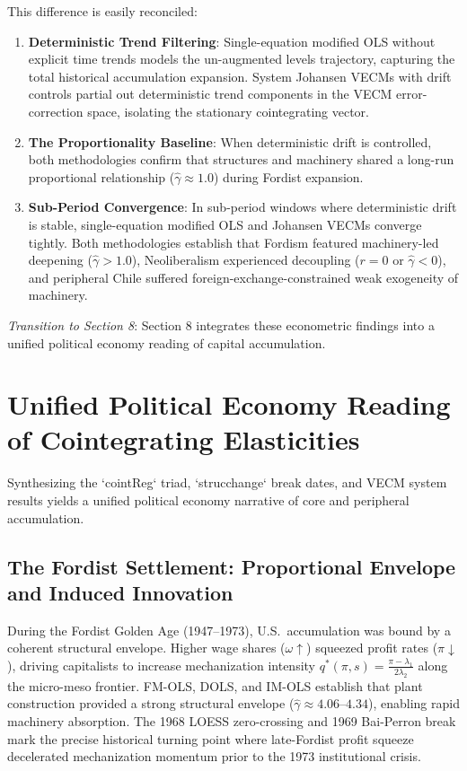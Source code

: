 \documentclass[11pt,a4paper]{article}
\begin{document}
This difference is easily reconciled:
\begin{enumerate}
    \item \textbf{Deterministic Trend Filtering}: Single-equation modified OLS without explicit time trends models the un-augmented levels trajectory, capturing the total historical accumulation expansion. System Johansen VECMs with drift controls partial out deterministic trend components in the VECM error-correction space, isolating the stationary cointegrating vector.
    \item \textbf{The Proportionality Baseline}: When deterministic drift is controlled, both methodologies confirm that structures and machinery shared a long-run proportional relationship ($\hat{\gamma} \approx 1.0$) during Fordist expansion.
    \item \textbf{Sub-Period Convergence}: In sub-period windows where deterministic drift is stable, single-equation modified OLS and Johansen VECMs converge tightly. Both methodologies establish that Fordism featured machinery-led deepening ($\hat{\gamma} > 1.0$), Neoliberalism experienced decoupling ($r=0$ or $\hat{\gamma} < 0$), and peripheral Chile suffered foreign-exchange-constrained weak exogeneity of machinery.
\end{enumerate}

\textit{Transition to Section 8}: Section 8 integrates these econometric findings into a unified political economy reading of capital accumulation.

\FloatBarrier
\section{Unified Political Economy Reading of Cointegrating Elasticities}

Synthesizing the `cointReg` triad, `strucchange` break dates, and VECM system results yields a unified political economy narrative of core and peripheral accumulation.

\subsection{The Fordist Settlement: Proportional Envelope and Induced Innovation}
During the Fordist Golden Age (1947--1973), U.S.\ accumulation was bound by a coherent structural envelope. Higher wage shares ($\omega \uparrow$) squeezed profit rates ($\pi \downarrow$), driving capitalists to increase mechanization intensity $q^*(\pi, s) = \frac{\pi - \lambda_1}{2\lambda_2}$ along the micro-meso frontier. FM-OLS, DOLS, and IM-OLS establish that plant construction provided a strong structural envelope ($\hat{\gamma} \approx 4.06$--$4.34$), enabling rapid machinery absorption. The 1968 LOESS zero-crossing and 1969 Bai-Perron break mark the precise historical turning point where late-Fordist profit squeeze decelerated mechanization momentum prior to the 1973 institutional crisis.
\end{document}
